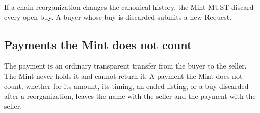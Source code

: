 If a chain reorganization changes the canonical history, the Mint MUST discard every open buy. A buyer whose buy is discarded submits a new Request.

\subsection{Payments the Mint does not count}

The payment is an ordinary transparent transfer from the buyer to the seller. The Mint never holds it and cannot return it. A payment the Mint does not count, whether for its amount, its timing, an ended listing, or a buy discarded after a reorganization, leaves the name with the seller and the payment with the seller.
